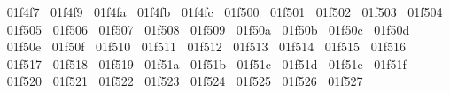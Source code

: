 {  ^^^^^^01f4f7%
  ^^^^^^01f4f9%
  ^^^^^^01f4fa%
  ^^^^^^01f4fb%
  ^^^^^^01f4fc%
  ^^^^^^01f500%
  ^^^^^^01f501%
  ^^^^^^01f502%
  ^^^^^^01f503%
  ^^^^^^01f504%
  ^^^^^^01f505%
  ^^^^^^01f506%
  ^^^^^^01f507%
  ^^^^^^01f508%
  ^^^^^^01f509%
  ^^^^^^01f50a%
  ^^^^^^01f50b%
  ^^^^^^01f50c%
  ^^^^^^01f50d%
  ^^^^^^01f50e%
  ^^^^^^01f50f%
  ^^^^^^01f510%
  ^^^^^^01f511%
  ^^^^^^01f512%
  ^^^^^^01f513%
  ^^^^^^01f514%
  ^^^^^^01f515%
  ^^^^^^01f516%
  ^^^^^^01f517%
  ^^^^^^01f518%
  ^^^^^^01f519%
  ^^^^^^01f51a%
  ^^^^^^01f51b%
  ^^^^^^01f51c%
  ^^^^^^01f51d%
  ^^^^^^01f51e%
  ^^^^^^01f51f%
  ^^^^^^01f520%
  ^^^^^^01f521%
  ^^^^^^01f522%
  ^^^^^^01f523%
  ^^^^^^01f524%
  ^^^^^^01f525%
  ^^^^^^01f526%
  ^^^^^^01f527%
}
